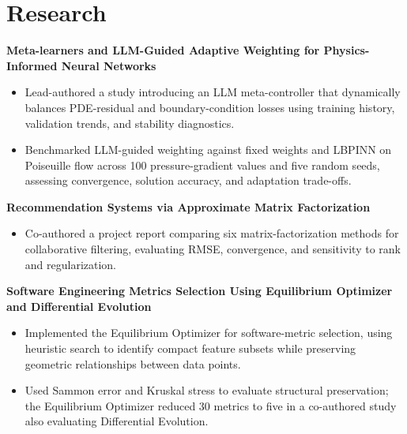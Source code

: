 \documentclass[11pt]{article}
\begin{document}
\section{Research}
\textbf{Meta-learners and LLM-Guided Adaptive Weighting for Physics-Informed Neural Networks}\par
\begin{itemize}
    \item Lead-authored a study introducing an LLM meta-controller that dynamically balances PDE-residual and boundary-condition losses using training history, validation trends, and stability diagnostics.
    \item Benchmarked LLM-guided weighting against fixed weights and LBPINN on Poiseuille flow across 100 pressure-gradient values and five random seeds, assessing convergence, solution accuracy, and adaptation trade-offs.
\end{itemize}
\vspace{6pt}
\textbf{Recommendation Systems via Approximate Matrix Factorization}\par
\begin{itemize}
    \item Co-authored a project report comparing six matrix-factorization methods for collaborative filtering, evaluating RMSE, convergence, and sensitivity to rank and regularization.
\end{itemize}
\vspace{6pt}
\textbf{Software Engineering Metrics Selection Using Equilibrium Optimizer and Differential Evolution}\par
\begin{itemize}
    \item Implemented the Equilibrium Optimizer for software-metric selection, using heuristic search to identify compact feature subsets while preserving geometric relationships between data points.
    \item Used Sammon error and Kruskal stress to evaluate structural preservation; the Equilibrium Optimizer reduced 30 metrics to five in a co-authored study also evaluating Differential Evolution.
\end{itemize}
\end{document}
